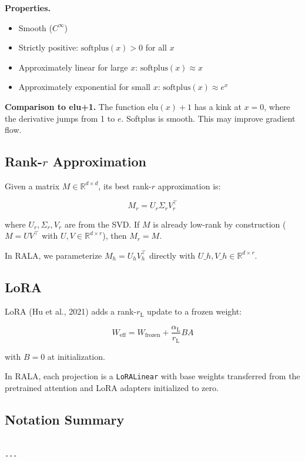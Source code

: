 \textbf{Properties.}
\begin{itemize}
\item Smooth ($C^\infty$)
\item Strictly positive: $\text{softplus}(x) > 0$ for all $x$
\item Approximately linear for large $x$: $\text{softplus}(x) \approx x$
\item Approximately exponential for small $x$: $\text{softplus}(x) \approx e^x$

\end{itemize}
\textbf{Comparison to elu+1.} The function $\mathrm{elu}(x) + 1$ has a kink at 
$x = 0$, where the derivative jumps from 1 to $e$. Softplus is smooth. This 
may improve gradient flow.

\subsection{Rank-$r$ Approximation}

Given a matrix $M \in \mathbb{R}^{d \times d}$, its best rank-$r$ 
approximation is:

\[
M_r = U_r \Sigma_r V_r^\top
\tag{3.6}
\]

where $U_r, \Sigma_r, V_r$ are from the SVD. If $M$ is already low-rank by 
construction ($M = U V^\top$ with $U, V \in \mathbb{R}^{d \times r}$), then 
$M_r = M$.

In RALA, we parameterize $M_h = U_h V_h^\top$ directly with $U\_h, V\_h \in 
\mathbb{R}^{d \times r}$.

\subsection{LoRA}

LoRA (Hu et al., 2021) adds a rank-$r_{\text{L}}$ update to a frozen 
weight:

\[
W_\text{eff} = W_\text{frozen} + \frac{\alpha_{\text{L}}}{r_{\text{L}}} B A
\tag{3.7}
\]

with $B = 0$ at initialization.

In RALA, each projection is a \texttt{LoRALinear} with base weights transferred 
from the pretrained attention and LoRA adapters initialized to zero.

\subsection{Notation Summary}

\begin{lstlisting}

---
\end{lstlisting}